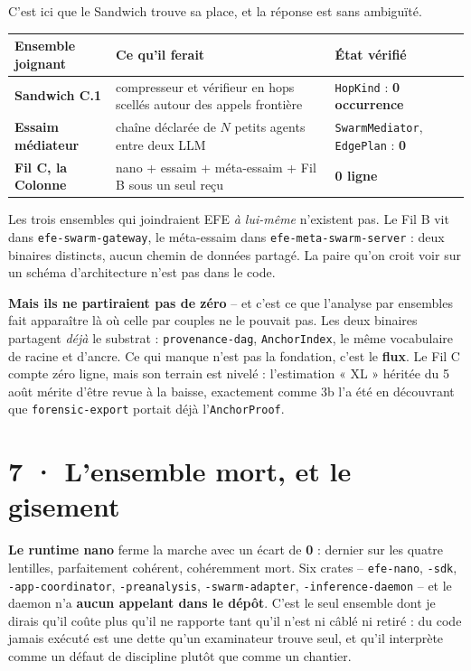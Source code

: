 \documentclass[10pt]{article}
\newcommand{\pire}[1]{{\color{red}\textbf{#1}}}
\newcommand{\code}[1]{\texttt{\small #1}}
\begin{document}
C'est ici que le Sandwich trouve sa place, et la réponse est sans ambiguïté.

\renewcommand{\arraystretch}{1.15}
\begin{center}\small
\begin{tabular}{@{}>{\raggedright\arraybackslash}p{5.4cm} >{\raggedright\arraybackslash}p{4.2cm} >{\raggedright\arraybackslash}p{5.9cm}@{}}
\toprule
\textbf{Ensemble joignant} & \textbf{Ce qu'il ferait} & \textbf{État vérifié} \\
\midrule
\textbf{Sandwich C.1} & compresseur et vérifieur en hops scellés autour des appels frontière & \code{HopKind} : \pire{0 occurrence} \\
\textbf{Essaim médiateur} & chaîne déclarée de $N$ petits agents entre deux LLM & \code{SwarmMediator}, \code{EdgePlan} : \pire{0} \\
\textbf{Fil C, la Colonne} & nano + essaim + méta-essaim + Fil B sous un seul reçu & \pire{0 ligne} \\
\bottomrule
\end{tabular}
\end{center}

Les trois ensembles qui joindraient EFE \emph{à lui-même} n'existent pas. Le Fil B vit dans
\code{efe-swarm-gateway}, le méta-essaim dans \code{efe-meta-swarm-server} : deux binaires distincts,
aucun chemin de données partagé. La paire qu'on croit voir sur un schéma d'architecture n'est pas dans
le code.

\begin{acquis}
\textbf{Mais ils ne partiraient pas de zéro} -- et c'est ce que l'analyse par ensembles fait apparaître
là où celle par couples ne le pouvait pas. Les deux binaires partagent \emph{déjà} le substrat :
\code{provenance-dag}, \code{AnchorIndex}, le même vocabulaire de racine et d'ancre. Ce qui manque n'est
pas la fondation, c'est le \textbf{flux}. Le Fil C compte zéro ligne, mais son terrain est nivelé :
l'estimation « XL » héritée du 5 août mérite d'être revue à la baisse, exactement comme 3b l'a été
en découvrant que \code{forensic-export} portait déjà l'\code{AnchorProof}.
\end{acquis}

\section{7 · L'ensemble mort, et le gisement}

\textbf{Le runtime nano} ferme la marche avec un écart de \textbf{0} : dernier sur les quatre lentilles,
parfaitement cohérent, cohéremment mort. Six crates -- \code{efe-nano}, \code{-sdk},
\code{-app-coordinator}, \code{-preanalysis}, \code{-swarm-adapter}, \code{-inference-daemon} -- et le
daemon n'a \textbf{aucun appelant dans le dépôt}. C'est le seul ensemble dont je dirais qu'il coûte plus
qu'il ne rapporte tant qu'il n'est ni câblé ni retiré : du code jamais exécuté est une dette qu'un
examinateur trouve seul, et qu'il interprète comme un défaut de discipline plutôt que comme un
chantier.
\end{document}
